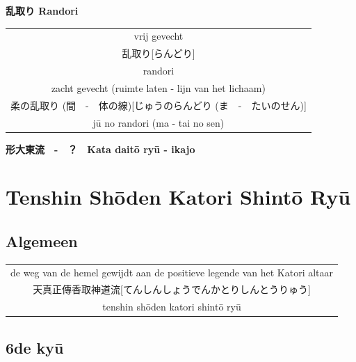 \documentclass[12pt]{scrartcl}
\begin{document}
\begin{CJK*}{UTF8}{min}
\begin{center}
    \textbf{乱取り Randori}
\end{center}
\begin{table}[H]
\begin{center}
\begin{tabular}{c}
vrij gevecht\\
乱取り[らんどり]\\
randori\\
\hline
zacht gevecht (ruimte laten - lijn van het lichaam)\\
柔の乱取り (間　-　体の線)[じゅうのらんどり (ま　-　たいのせん)] \\
j\={u} no randori (ma - tai no sen)
\end{tabular}
\end{center}
\label{randori}
\end{table}

\begin{center}
    \textbf{形大東流　-　？　Kata dait\={o} ry\={u} - ikajo}
\end{center}

\newpage
\section{Tenshin Sh\={o}den Katori Shint\={o} Ry\={u}}
\subsection{Algemeen}
\begin{table}[H]
\begin{center}
\begin{tabular}{c}
de weg van de hemel gewijdt aan de positieve legende van het Katori altaar\\ 
天真正傳香取神道流[てんしんしょうでんかとりしんとうりゅう]\\
tenshin sh\={o}den katori shint\={o} ry\={u}
\end{tabular}
\end{center}
\label{katori}
\end{table}


\subsection{6de ky\={u}}

\end{CJK*}
\end{document}
